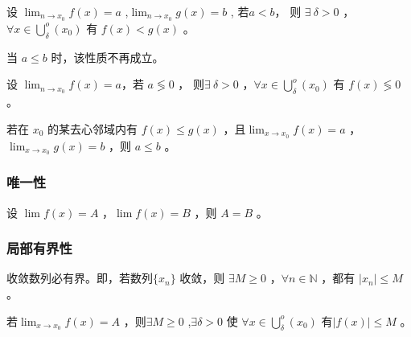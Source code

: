 \begin{Theo}[\ ]

    设 $ \displaystyle\lim_{n\rightarrow x_0}f(x)=a $ ,$ \displaystyle\lim_{n\rightarrow x_0}g(x)=b $ ,
    若$ a<b $， 则 $ \exists\ \delta>0$ ， $ \forall x\in \bigcup\limits^o_\delta(x_0)$ 有 $ f(x)<g(x) $ 。
    
    当 $ a\leq b $ 时，该性质不再成立。
\end{Theo}


\begin{Infer}[\ ]

    设 $ \displaystyle\lim_{n\rightarrow x_0}f(x)=a $，若 $ a \lessgtr 0 $ ，
    则$ \exists\ \delta>0 $ ，$ \forall x\in \bigcup\limits^o_\delta(x_0)$ 有 $ f(x)\lessgtr0 $ 。
\end{Infer}

\begin{Theo}[\ ]

    若在 $ x_0 $ 的某去心邻域内有 $ f(x)\leq g(x) $ ，且$ \displaystyle\lim_{x\rightarrow x_0}f(x)=a $ ，
    $ \displaystyle\lim_{x\rightarrow x_0}g(x)=b $ ，则 $ a\leq b $ 。
\end{Theo}

\subsubsection{唯一性}

\begin{Theo}[唯一性]

    设 $ \displaystyle\lim f(x)=A $ ，$ \lim f(x)=B $ ，则 $ A=B $ 。    
\end{Theo}

\subsubsection{局部有界性}

\begin{Theo}[\ ]

    收敛数列必有界。即，若数列$ \{x_n\} $ 收敛，则 $ \exists M\geq0 $ ，$ \forall n\in\mathbb{N} $ ，都有 $ |x_n|\leq M $ 。
\end{Theo}

\begin{Theo}[\ ]

    若$ \displaystyle\lim_{x\rightarrow x_0}f(x)=A $ ，则$ \exists M\geq 0 $ ,$ \exists \delta>0 $ 使
    $ \forall x\in\bigcup\limits^o_\delta(x_0) $ 有$ |f(x)|\leq M $ 。
\end{Theo}


